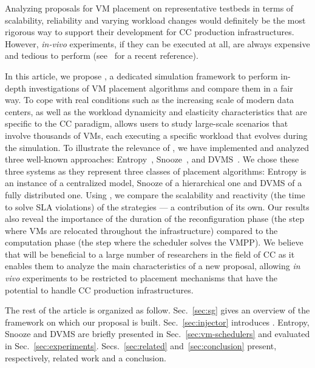 Analyzing proposals for VM placement on representative testbeds in
terms of scalability, reliability and varying workload changes would
definitely be the most rigorous way to support their development for
CC production infrastructures.
However, \textit{in-vivo} experiments, if they can be executed at all,
are always expensive and tedious to perform (see~\cite{barker:pitfalls} for a recent reference).

In this article, we propose \vmps, a dedicated simulation framework to
perform in-depth investigations of VM placement algorithms and compare
them in a fair way. To cope with real conditions such as the
increasing scale of modern data centers, as well as the workload
dynamicity and elasticity characteristics that are specific to the CC
paradigm, \vmps allows users to study large-scale scenarios
that involve thousands of VMs,
each executing a specific workload that evolves during the
simulation.
%
%
To illustrate the relevance of \vmps, we have implemented and analyzed
three well-known approaches:
Entropy~\cite{Hermenier:2009:ECM:1508293.1508300},
Snooze~\cite{feller:ccgrid12}, and DVMS~\cite{quesnel:cpe2012}.
We chose these three systems as they represent three classes of
placement algorithms: Entropy is an instance of a centralized model,
Snooze of a hierarchical one and DVMS of a fully distributed one.
Using \vmps, we compare the scalability and reactivity (\ie the time
to solve SLA violations) of the strategies --- a contribution of its
own.  Our results also reveal the importance of the duration of the
reconfiguration phase (\ie the step where VMs are relocated throughout
the infrastructure) compared to the computation phase (\ie the step
where the scheduler solves the VMPP).
%
%
We believe that \vmps will be beneficial to a large number of
researchers in the field of CC as it enables them to analyze the main
characteristics of a new proposal, allowing \textit{in vivo}
experiments to be restricted to placement mechanisms that have the
potential to handle CC production infrastructures.

The rest of the article is
organized as follow.
Sec.~\ref{sec:sg} gives an overview of the \sg
framework on which our proposal is built. Sec.~\ref{sec:injector}
introduces \vmps.
Entropy, Snooze and DVMS are briefly presented in
Sec.~\ref{sec:vm-schedulers} and evaluated in
Sec.~\ref{sec:experiments}. Secs.~\ref{sec:related}
and~\ref{sec:conclusion} present, respectively, related work and a
conclusion.




